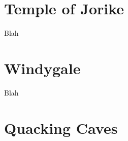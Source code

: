 \documentclass[letterpaper]{article}
\begin{document}
\begin{multicols}{2}
			\section{Temple of Jorike~\label{location-temple}}
				\begin{mdframed}[style=BoxedText]
					Blah
				\end{mdframed}
			\section{Windygale~\label{location-town}}
				\begin{mdframed}[style=BoxedText]
					Blah
				\end{mdframed}
			\section{Quacking Caves~\label{location-caves}}
				\begin{mdframed}[style=BoxedText]
				\end{mdframed}
	\end{multicols}
\end{document}
